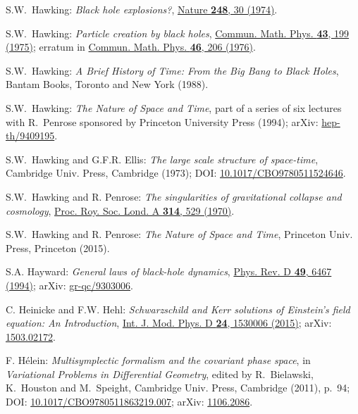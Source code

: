 \begin{thebibliography}{123}
S.W.~Hawking: {\em Black hole explosions?},
\href{https://doi.org/10.1038/248030a0}{Nature {\bf 248}, 30 (1974)}.

S.W.~Hawking:
{\em Particle creation by black holes},
\href{https://doi.org/10.1007/BF02345020}{Commun. Math. Phys. {\bf 43}, 199 (1975)}; erratum
in \href{https://doi.org/10.1007/BF01608497}{Commun. Math. Phys. {\bf 46}, 206 (1976)}.

S.W.~Hawking:
{\em A Brief History of Time: From the Big Bang to Black Holes},
Bantam Books, Toronto and New York (1988).

S.W.~Hawking:
{\em The Nature of Space and Time}, part of a series of six lectures with
R.~Penrose sponsored by Princeton University Press (1994);
arXiv: \href{https://arxiv.org/abs/hep-th/9409195}{hep-th/9409195}.

S.W.~Hawking and G.F.R. Ellis: {\em The large scale structure of
space-time},
Cambridge Univ. Press, Cambridge (1973);
DOI: \href{https://doi.org/10.1017/CBO9780511524646}{10.1017/CBO9780511524646}.

S.W.~Hawking and R. Penrose: {\em The singularities of gravitational collapse and cosmology},
\href{https://doi.org/10.1098/rspa.1970.0021}{Proc. Roy. Soc. Lond. A {\bf 314}, 529 (1970)}.

S.W.~Hawking and R. Penrose: {\em The Nature of Space and Time},
Princeton Univ. Press, Princeton (2015).

S.A. Hayward:
{\em General laws of black-hole dynamics},
\href{https://doi.org/10.1103/PhysRevD.49.6467}{Phys. Rev. D {\bf 49}, 6467 (1994)};
arXiv: \href{https://arxiv.org/abs/gr-qc/9303006}{gr-qc/9303006}.

C. Heinicke and F.W. Hehl:
{\em Schwarzschild and Kerr solutions of Einstein's field equation: An Introduction},
\href{https://doi.org/10.1142/S0218271815300062}{Int. J. Mod. Phys. D {\bf 24}, 1530006 (2015)};
arXiv: \href{https://arxiv.org/abs/1503.02172}{1503.02172}.

F. Hélein:
{\em Multisymplectic formalism and the covariant phase space},
in {\em Variational Problems in Differential Geometry},
edited by R.~Bielawski, K.~Houston and M.~Speight,
Cambridge Univ. Press, Cambridge (2011), p.~94;
DOI: \href{https://doi.org/10.1017/CBO9780511863219.007}{10.1017/CBO9780511863219.007};
arXiv: \href{https://arxiv.org/abs/1106.2086}{1106.2086}.


\end{thebibliography}
